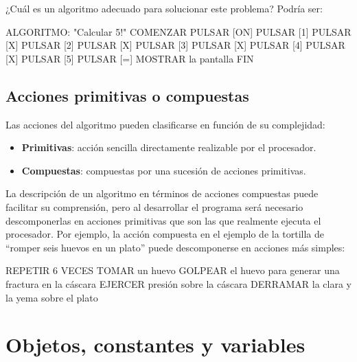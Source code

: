 \documentclass[
]{book}
\newenvironment{Shaded}{\begin{snugshade}}{\end{snugshade}}
\newcommand{\NormalTok}[1]{#1}
\providecommand{\tightlist}{%
  \setlength{\itemsep}{0pt}\setlength{\parskip}{0pt}}
\begin{document}
¿Cuál es un algoritmo adecuado para solucionar este problema? Podría ser:

\begin{Shaded}
\begin{Highlighting}[]
\NormalTok{ALGORITMO: "Calcular 5!"}
\NormalTok{COMENZAR}
\NormalTok{    PULSAR [ON]}
\NormalTok{    PULSAR [1]}
\NormalTok{    PULSAR [X]}
\NormalTok{    PULSAR [2]}
\NormalTok{    PULSAR [X]}
\NormalTok{    PULSAR [3]}
\NormalTok{    PULSAR [X]}
\NormalTok{    PULSAR [4]}
\NormalTok{    PULSAR [X]}
\NormalTok{    PULSAR [5]}
\NormalTok{    PULSAR [=]}
\NormalTok{    MOSTRAR la pantalla}
\NormalTok{FIN}
\end{Highlighting}
\end{Shaded}

\hypertarget{acciones-primitivas-o-compuestas}{%
\subsection{Acciones primitivas o compuestas}\label{acciones-primitivas-o-compuestas}}

Las acciones del algoritmo pueden clasificarse en función de su complejidad:

\begin{itemize}
\tightlist
\item
  \textbf{Primitivas}: acción sencilla directamente realizable por el procesador.
\item
  \textbf{Compuestas}: compuestas por una sucesión de acciones primitivas.
\end{itemize}

La descripción de un algoritmo en términos de acciones compuestas puede facilitar su comprensión, pero al desarrollar el programa será necesario descomponerlas en acciones primitivas que son las que realmente ejecuta el procesador. Por ejemplo, la acción compuesta en el ejemplo de la tortilla de ``romper seis huevos en un plato'' puede descomponerse en acciones más simples:

\begin{Shaded}
\begin{Highlighting}[]
\NormalTok{REPETIR 6 VECES}
\NormalTok{    TOMAR un huevo}
\NormalTok{    GOLPEAR el huevo para generar una fractura en la cáscara}
\NormalTok{    EJERCER presión sobre la cáscara}
\NormalTok{    DERRAMAR la clara y la yema sobre el plato}
\end{Highlighting}
\end{Shaded}

\hypertarget{objetos-constantes-y-variables}{%
\section{Objetos, constantes y variables}\label{objetos-constantes-y-variables}}
\end{document}
